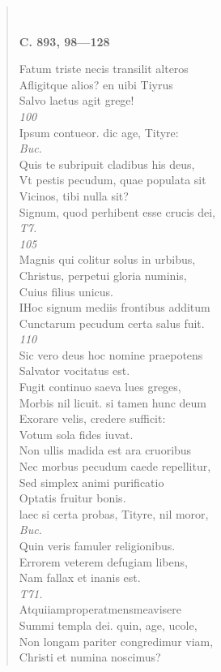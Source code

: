 \documentclass[11pt, a4paper]{report}
\begin{document}
\begin{verse}
        ﻿\pagebreak 
     \marginpar{[338]} \begin{center} \textbf{C. 893, 98—128} \end{center}Fatum triste necis transilit alteros \\ Afligitque alios? en uibi Tiyrus \\ Salvo laetus agit grege! \\ \textit{100} \\ Ipsum contueor. dic age, Tityre: \\ \textit{Buc.} \\ Quis te subripuit cladibus his deus, \\ Vt pestis pecudum, quae populata sit \\ Vicinos, tibi nulla sit? \\ Signum, quod perhibent esse crucis dei, \\ \textit{T7.} \\ \textit{105} \\ Magnis qui colitur solus in urbibus, \\ Christus, perpetui gloria numinis, \\ Cuius filius unicus. \\ IHoc signum mediis frontibus additum \\ Cunctarum pecudum certa salus fuit. \\ \textit{110} \\ Sic vero deus hoc nomine praepotens \\ Salvator vocitatus est. \\ Fugit continuo saeva lues greges, \\ Morbis nil licuit. si tamen hunc deum \\ Exorare velis, credere sufficit: \\ Votum sola fides iuvat. \\ Non ullis madida est ara cruoribus \\ Nec morbus pecudum caede repellitur, \\ Sed simplex animi purificatio \\ Optatis fruitur bonis. \\ laec si certa probas, Tityre, nil moror, \\ \textit{Buc.} \\ Quin veris famuler religionibus. \\ Errorem veterem defugiam libens, \\ Nam fallax et inanis est. \\ \textit{T71.} \\ Atquiiamproperatmensmeavisere \\ Summi templa dei. quin, age, ucole, \\ Non longam pariter congredimur viam, \\ Christi et numina noscimus? \\ 

\end{verse}
\end{document}
